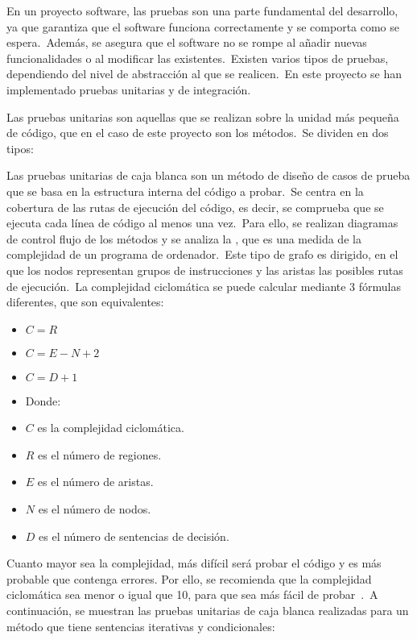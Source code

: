 
En un proyecto software, las pruebas son una parte fundamental del desarrollo, ya que garantiza que el software funciona
correctamente y se comporta como se espera.\ Además, se asegura que el software no se rompe al añadir nuevas
funcionalidades o al modificar las existentes.\ Existen varios tipos de pruebas, dependiendo del nivel de abstracción
al que se realicen.\ En este proyecto se han implementado pruebas unitarias y de integración.


Las pruebas unitarias son aquellas que se realizan sobre la unidad más pequeña de código, que en el caso de este
proyecto son los métodos.\ Se dividen en dos tipos:


Las pruebas unitarias de caja blanca son un método de diseño de casos de prueba que se basa en la estructura interna
del código a probar.\ Se centra en la cobertura de las rutas de ejecución del código, es decir, se comprueba que se
ejecuta cada línea de código al menos una vez.\ Para ello, se realizan diagramas de control flujo de los métodos y se
analiza la , que es una medida de la complejidad de un programa de
ordenador.\ Este tipo de grafo es dirigido, en el que los
nodos representan grupos de instrucciones y las aristas las posibles rutas de ejecución.\ La complejidad ciclomática
se puede calcular mediante 3 fórmulas diferentes, que son equivalentes:

\begin{itemize}
	\item $C = R$
	\item $C = E - N + 2$
	\item $C = D + 1$
	\item Donde:
	\item $C$ es la complejidad ciclomática.
	\item $R$ es el número de regiones.
	\item $E$ es el número de aristas.
	\item $N$ es el número de nodos.
	\item $D$ es el número de sentencias de decisión.
\end{itemize}

Cuanto mayor sea la complejidad, más difícil será probar el código y es más probable que contenga errores.
Por ello, se recomienda que la complejidad ciclomática sea menor o igual que 10, para que sea más fácil de
probar~\cite{Cyclomat84:online}.\ A continuación, se muestran las pruebas unitarias de caja blanca
realizadas para un método que tiene sentencias iterativas y condicionales:

